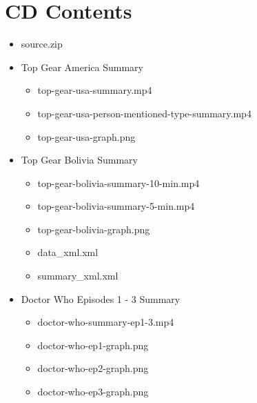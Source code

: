 \newpage
\section{CD Contents}
\label{sec:CD}
\begin{itemize}
	\item{source.zip}
	\item{Top Gear America Summary}
	\begin{itemize}
		\item{top-gear-usa-summary.mp4}
		\item{top-gear-usa-person-mentioned-type-summary.mp4}
		\item{top-gear-usa-graph.png}
	\end{itemize}
	\item{Top Gear Bolivia Summary}
	\begin{itemize}
		\item{top-gear-bolivia-summary-10-min.mp4}
		\item{top-gear-bolivia-summary-5-min.mp4}
		\item{top-gear-bolivia-graph.png}
		\item{data\_xml.xml}
		\item{summary\_xml.xml}\
	\end{itemize}
	\item{Doctor Who Episodes 1 - 3 Summary}
	\begin{itemize}
		\item{doctor-who-summary-ep1-3.mp4}
		\item{doctor-who-ep1-graph.png}
		\item{doctor-who-ep2-graph.png}
		\item{doctor-who-ep3-graph.png}
	\end{itemize}
\end{itemize}